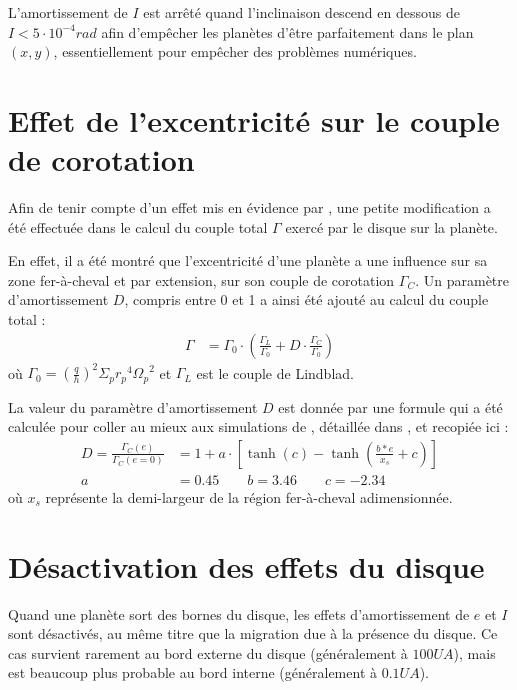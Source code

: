 L'amortissement de $I$ est arrêté quand l'inclinaison descend en dessous de $I<5\cdot 10^{-4}\unit{rad}$ afin d'empêcher les planètes d'être parfaitement dans le plan $(x,y)$, essentiellement pour empêcher des problèmes numériques.

\section{Effet de l'excentricité sur le couple de corotation}
Afin de tenir compte d'un effet mis en évidence par \cite{bitsch2010orbital}, une petite modification a été effectuée dans le calcul du couple total $\Gamma$ exercé par le disque sur la planète. 

En effet, il a été montré que l'excentricité d'une planète a une influence sur sa zone fer-à-cheval et par extension, sur son couple de corotation $\Gamma_C$. Un paramètre d'amortissement $D$, compris entre 0 et 1 a ainsi été ajouté au calcul du couple total \citep{hellary2012global} :
\begin{align}
\Gamma &= \Gamma_0 \cdot (\frac{\Gamma_L}{\Gamma_0} + D\cdot \frac{\Gamma_C}{\Gamma_0})
\end{align}
où $\Gamma_0 = \left(\frac{q}{h}\right)^2\Sigma_p {r_p}^4 {\Omega_p}^2$ et $\Gamma_L$ est le couple de Lindblad.

La valeur du paramètre d'amortissement $D$ est donnée par une formule qui a été calculée pour coller au mieux aux simulations de \cite{bitsch2010orbital}, détaillée dans \cite{cossou2013convergence}, et recopiée ici : 
\begin{subequations}
\begin{align}
D = \frac{\Gamma_C(e)}{\Gamma_C (e=0)} &= 1 + a \cdot \left[\tanh(c) - \tanh\left(\frac{b * e}{x_s}+c\right)\right]\label{eq:eccentricity-influence}\\
a &= 0.45 \qquad b=3.46 \qquad c= -2.34
\end{align}
\end{subequations}
où $x_s$ représente la demi-largeur de la région fer-à-cheval adimensionnée.

\section{Désactivation des effets du disque}
Quand une planète sort des bornes du disque, les effets d'amortissement de $e$ et $I$ sont désactivés, au même titre que la migration due à la présence du disque. Ce cas survient rarement au bord externe du disque (généralement à $100\unit{UA}$), mais est beaucoup plus probable au bord interne (généralement à $0.1\unit{UA}$).

